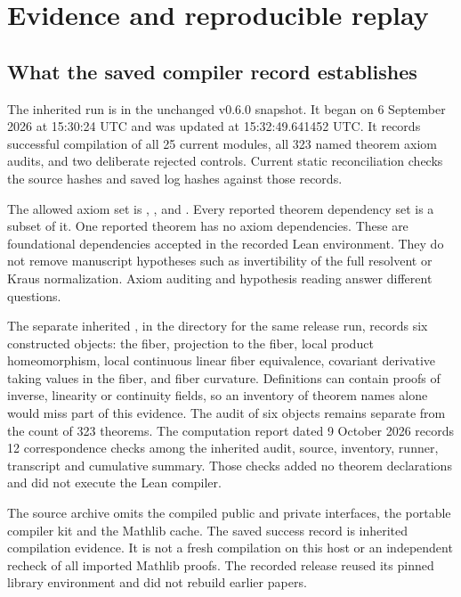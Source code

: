 \section{Evidence and reproducible replay}
\label{sec:replay}

\subsection{What the saved compiler record establishes}
The inherited run is  in the unchanged v0.6.0 snapshot. It began on 6 September 2026 at 15:30:24 UTC and was updated at 15:32:49.641452 UTC. It records successful compilation of all 25 current modules, all 323 named theorem axiom audits, and two deliberate rejected controls. Current static reconciliation checks the source hashes and saved log hashes against those records.

The allowed axiom set is , , and . Every reported theorem dependency set is a subset of it. One reported theorem has no axiom dependencies. These are foundational dependencies accepted in the recorded Lean environment. They do not remove manuscript hypotheses such as invertibility of the full resolvent or Kraus normalization. Axiom auditing and hypothesis reading answer different questions.

The separate inherited , in the directory for the same release run, records six constructed objects: the fiber, projection to the fiber, local product homeomorphism, local continuous linear fiber equivalence, covariant derivative taking values in the fiber, and fiber curvature. Definitions can contain proofs of inverse, linearity or continuity fields, so an inventory of theorem names alone would miss part of this evidence. The audit of six objects remains separate from the count of 323 theorems. The computation report dated 9 October 2026 records 12 correspondence checks among the inherited audit, source, inventory, runner, transcript and cumulative summary. Those checks added no theorem declarations and did not execute the Lean compiler.

The source archive omits the compiled public and private interfaces, the portable compiler kit and the Mathlib cache. The saved success record is inherited compilation evidence. It is not a fresh compilation on this host or an independent recheck of all imported Mathlib proofs. The recorded release reused its pinned library environment and did not rebuild earlier papers.


